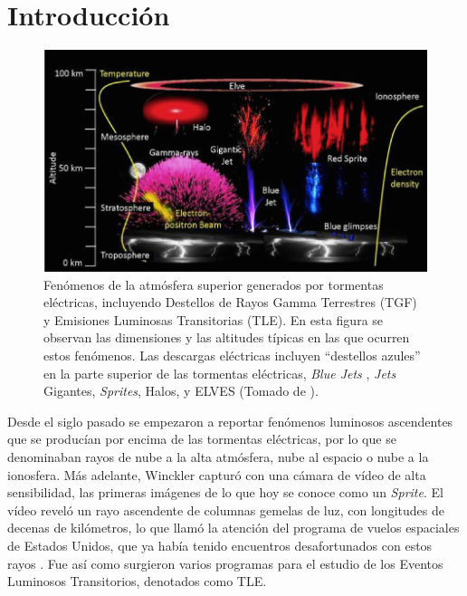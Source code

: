 \documentclass[11pt,oneside,openany,letter]{book}
\begin{document}
\chapter*{Introducci\'on}\label{introduccion}
\begin{figure}
    \centering
    \includegraphics[scale=0.7]{figures/tle_and_tgf.png}
    \caption[Fenómenos de la atmósfera superior generados por tormentas eléctricas]{Fenómenos de la atmósfera superior generados por tormentas eléctricas, incluyendo Destellos de Rayos Gamma Terrestres (TGF) y Emisiones Luminosas Transitorias (TLE). En esta figura se observan las dimensiones y las altitudes típicas en las que ocurren estos fenómenos. Las descargas eléctricas incluyen ``destellos azules'' en la parte superior de las tormentas eléctricas, \textit{Blue Jets} , \textit{Jets} Gigantes, \textit{Sprites}, Halos, y ELVES (Tomado de \cite{Gaskill2018}).}
    \label{fig:tle_and_tgf}
\end{figure}
Desde el siglo pasado se empezaron a reportar fen\'omenos luminosos ascendentes que se produc\'ian por encima de las tormentas el\'ectricas, por lo que se denominaban rayos de nube a la alta atmósfera, nube al espacio o nube a la ionosfera. M\'as adelante, Winckler \cite{FranzEtal1990} captur\'o con una c\'amara de v\'ideo de alta sensibilidad, las primeras imágenes de lo que hoy se conoce como un \textit{Sprite}. El v\'ideo revel\'o un rayo ascendente de columnas gemelas de luz, con longitudes de decenas de kil\'ometros, lo que llam\'o la atenci\'on del programa de vuelos espaciales de Estados Unidos, que ya hab\'ia tenido encuentros desafortunados con estos rayos \cite{UmanRakov2003}. Fue as\'i como surgieron varios programas para el estudio de los Eventos Luminosos Transitorios, denotados como TLE. 
\end{document}
